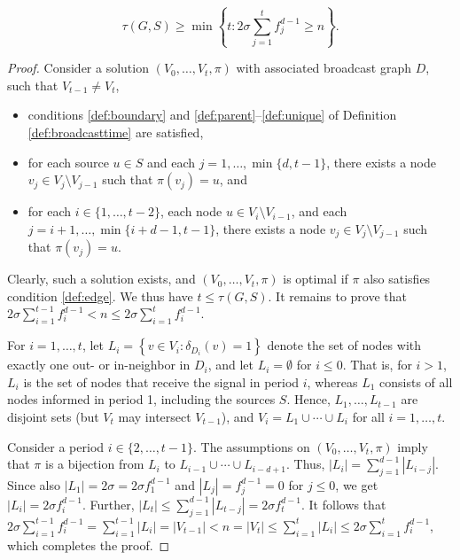 \begin{proposition}
\begin{equation*}
\label{lem:lbreg1}
	\tau(G,S)\geq\min\left\{t:2\sigma\sum\limits_{j=1}^tf^{d-1}_j\geq n\right\}.
\end{equation*}
\label{prop:lbfib}
\end{proposition}
\begin{proof}
Consider a solution $\left(V_0,\ldots,V_t,\pi\right)$ with associated broadcast graph $D$, such that $V_{t-1}\neq V_t$, 
\begin{itemize}
  \item conditions \ref{def:boundary} and \ref{def:parent}--\ref{def:unique} of Definition \ref{def:broadcasttime} are satisfied,
  \item for each source $u\in S$ and each $j=1,\ldots,\min\{d,t-1\}$, there exists a node $v_j\in V_j\setminus V_{j-1}$ such that $\pi\left(v_j\right)=u$, and
  \item for each $i\in\{1,\ldots,t-2\}$, each node $u\in V_i\setminus V_{i-1}$, and each $j=i+1,\ldots,\min\{i+d-1,t-1\}$,
        there exists a node $v_j\in V_j\setminus V_{j-1}$ such that $\pi\left(v_j\right)=u$.
\end{itemize}
\noindent
Clearly, such a solution exists, and $\left(V_0,\ldots,V_t,\pi\right)$ is optimal if $\pi$ also satisfies condition \ref{def:edge}.
We thus have $t\leq\tau(G,S)$.
It remains to prove that $2\sigma\sum_{i=1}^{t-1}f_i^{d-1}<n\leq 2\sigma\sum_{i=1}^tf_i^{d-1}$.

For $i=1,\ldots,t$, let $L_i=\left\{v\in V_i:\delta_{D_i}(v)=1\right\}$ denote the set of nodes with exactly one out- or in-neighbor in $D_i$,
and let $L_i=\emptyset$ for $i\leq 0$.
That is, for $i>1$, $L_i$ is the set of nodes that receive the signal in period $i$, whereas $L_1$ consists of all nodes informed in period 1, including the sources $S$.
Hence, $L_1,\ldots,L_{t-1}$ are disjoint sets (but $V_t$ may intersect $V_{t-1}$), and $V_i=L_1\cup\cdots\cup L_i$ for all $i=1,\ldots,t$.

Consider a period $i\in\{2,\ldots,t-1\}$.
The assumptions on $\left(V_0,\ldots,V_t,\pi\right)$ imply that $\pi$ is a bijection from $L_i$ to $L_{i-1}\cup\cdots\cup L_{i-d+1}$.
Thus, $\left|L_i\right|=\sum_{j=1}^{d-1}\left|L_{i-j}\right|$.
Since also $\left|L_1\right|=2\sigma=2\sigma f_1^{d-1}$ and $\left|L_j\right|=f_j^{d-1}=0$ for $j\leq 0$,
we get $\left|L_i\right|=2\sigma f_i^{d-1}$.
Further, $\left|L_t\right|\leq\sum_{j=1}^{d-1}\left|L_{t-j}\right|=2\sigma f_t^{d-1}$.
It follows that $2\sigma\sum_{i=1}^{t-1}f_i^{d-1}=\sum_{i=1}^{t-1}\left|L_i\right|=\left|V_{t-1}\right|<n=\left|V_t\right|\leq\sum_{i=1}^t\left|L_i\right|\leq 2\sigma\sum_{i=1}^tf_i^{d-1}$,
which completes the proof.
\end{proof}

